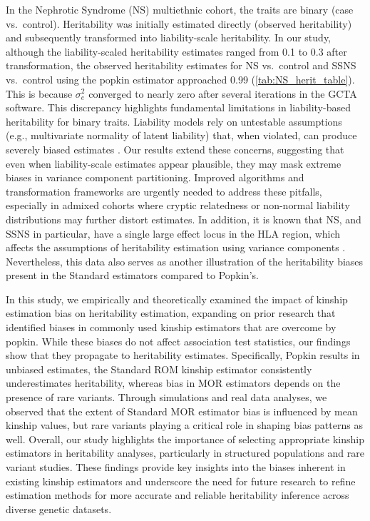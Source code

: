 \documentclass[11pt]{article}
\begin{document}
In the Nephrotic Syndrome (NS) multiethnic cohort, the traits are binary (case vs.~control). Heritability was initially estimated directly (observed heritability) and subsequently transformed into liability-scale heritability. In our study, although the liability-scaled heritability estimates ranged from 0.1 to 0.3 after transformation, the observed heritability estimates for NS vs.~control and SSNS vs.~control using the popkin estimator approached 0.99  (\cref{tab:NS_herit_table}). This is because ${\sigma}^2_e$ converged to nearly zero after several iterations in the GCTA software. This discrepancy highlights fundamental limitations in liability-based heritability for binary traits.
Liability models rely on untestable assumptions (e.g., multivariate normality of latent liability) that, when violated, can produce severely biased estimates \citep{benchek2013meaningful}. Our results extend these concerns, suggesting that even when liability-scale estimates appear plausible, they may mask extreme biases in variance component partitioning. Improved algorithms and transformation frameworks are urgently needed to address these pitfalls, especially in admixed cohorts where cryptic relatedness or non-normal liability distributions may further distort estimates.
In addition, it is known that NS, and SSNS in particular, have a single large effect locus in the HLA region, which affects the assumptions of heritability estimation using variance components \citep{gbadegesin2015hla,adeyemo2018hla,debiec2018transethnic,jia2018strong,dufek2019genetic,jia2020common,barry2023multi}.
Nevertheless, this data also serves as another illustration of the heritability biases present in the Standard estimators compared to Popkin's.

In this study, we empirically and theoretically examined the impact of kinship estimation bias on heritability estimation, expanding on prior research that identified biases in commonly used kinship estimators that are overcome by popkin. While these biases do not affect association test statistics, our findings show that they propagate to heritability estimates. Specifically, Popkin results in unbiased estimates, the Standard ROM kinship estimator consistently underestimates heritability, whereas bias in MOR estimators depends on the presence of rare variants. Through simulations and real data analyses, we observed that the extent of Standard MOR estimator bias is influenced by mean kinship values, but rare variants playing a critical role in shaping bias patterns as well. Overall, our study highlights the importance of selecting appropriate kinship estimators in heritability analyses, particularly in structured populations and rare variant studies. These findings provide key insights into the biases inherent in existing kinship estimators and underscore the need for future research to refine estimation methods for more accurate and reliable heritability inference across diverse genetic datasets.
\end{document}
